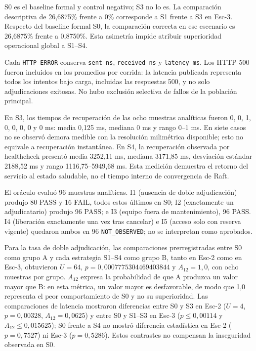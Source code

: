 S0 es el baseline formal y control negativo; S3 no lo es. La comparación
descriptiva de 26,6875\% frente a 0\% corresponde a S1 frente a S3 en Esc-3.
Respecto del baseline formal S0, la comparación correcta en ese escenario es
26,6875\% frente a 0,8750\%. Esta asimetría impide atribuir superioridad
operacional global a S1--S4.

Cada \texttt{HTTP\_ERROR} conserva \texttt{sent\_ns}, \texttt{received\_ns} y
\texttt{latency\_ms}. Los HTTP 500 fueron incluidos en los promedios por corrida:
la latencia publicada representa todos los intentos bajo carga, incluidas las
respuestas 500, y no solo adjudicaciones exitosas. No hubo exclusión selectiva
de fallos de la población principal.

En S3, los tiempos de recuperación de las ocho muestras analíticas fueron 0,
0, 1, 0, 0, 0, 0 y 0 ms: media 0,125 ms, mediana 0 ms y rango 0--1 ms. En siete
casos no se observó demora medible con la resolución milimétrica disponible;
esto no equivale a recuperación instantánea. En S4, la recuperación observada
por healthcheck presentó media 3252,11 ms, mediana 3171,85 ms, desviación
estándar 2188,52 ms y rango 1116,75--5949,68 ms. Esta medición demuestra el
retorno del servicio al estado saludable, no el tiempo interno de convergencia
de Raft.

El oráculo evaluó 96 muestras analíticas. I1 (ausencia de doble adjudicación)
produjo 80 PASS y 16 FAIL, todos estos últimos en S0; I2 (exactamente un
adjudicatario) produjo 96 PASS; e I3 (equipo fuera de mantenimiento), 96 PASS.
I4 (liberación exactamente una vez tras cancelar) e I5 (acceso solo con reserva
vigente) quedaron ambos en 96 \texttt{NOT\_OBSERVED}; no se interpretan como
aprobados.

Para la tasa de doble adjudicación, las comparaciones prerregistradas entre S0
como grupo A y cada estrategia S1--S4 como grupo B, tanto en Esc-2 como en
Esc-3, obtuvieron $U=64$, $p=0,0007775304469403844$ y $A_{12}=1,0$, con ocho muestras por
grupo. $A_{12}$ expresa la probabilidad de que A produzca un valor mayor que B:
en esta métrica, un valor mayor es desfavorable, de modo que 1,0 representa el
peor comportamiento de S0 y no su superioridad. Las comparaciones de latencia
mostraron diferencias entre S0 y S3 en Esc-2 ($U=4$, $p=0,00328$,
$A_{12}=0,0625$) y entre S0 y S1--S3 en Esc-3 ($p\leq0,00114$ y
$A_{12}\leq0,015625$); S0 frente a S4 no mostró diferencia estadística en
Esc-2 ($p=0,7527$) ni Esc-3 ($p=0,5286$). Estos contrastes no compensan la
inseguridad observada en S0.

